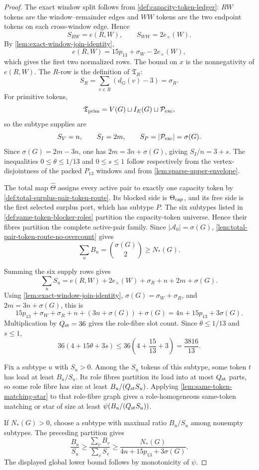 \documentclass[11pt]{article}
\begin{document}
\begin{proof}
The exact window split follows from \cref{def:capacity-token-ledger}: \(RW\)
tokens are the window--remainder edges and \(WW\) tokens are the two endpoint
tokens on each cross-window edge.  Hence
\[
S_{RW}=e(R,W),\qquad S_{WW}=2e_\times(W).
\]
By \cref{lem:exact-window-join-identity},
\[
e(R,W)=15p_{13}+\sigma_W-2e_\times(W),
\]
which gives the first two normalized rows.  The bound on \(x\) is the
nonnegativity of \(e(R,W)\).  The \(R\)-row is the definition of
\(\mathfrak T_R\):
\[
S_R=\sum_{v\in R}(d_G(v)-3)=\sigma_R.
\]
For primitive tokens,
\[
\mathfrak T_{\rm prim}=V(G)\sqcup I_E(G)\sqcup\mathcal P_{\rm exc},
\]
so the subtype supplies are
\[
S_V=n,\qquad S_I=2m,\qquad S_P=|\mathcal P_{\rm exc}|=\sigma(G).
\]
Since \(\sigma(G)=2m-3n\), one has \(2m=3n+\sigma(G)\), giving
\(S_I/n=3+s\).  The inequalities \(0\le\theta\le1/13\) and \(0\le s\le1\)
follow respectively from the vertex-disjointness of the packed \(P_{13}\)
windows and from \cref{lem:sparse-upper-envelope}.

The total map \(\widehat\Theta\) assigns every active pair to exactly one
capacity token by \cref{def:total-surplus-pair-token-route}.  Its blocked side
is \(\Theta_{\rm cap}\), and its free side is the first selected surplus port,
which has subtype \(P\).  The six subtypes listed in
\cref{def:same-token-blocker-roles} partition the capacity-token universe.
Hence their fibres partition the complete active-pair family.  Since
\(|\mathcal A_0|=\sigma(G)\),
\cref{lem:total-pair-token-route-no-overcount} gives
\[
\sum_u B_u=\binom{\sigma(G)}2\ge N_*(G).
\]

Summing the six supply rows gives
\[
\sum_uS_u
=e(R,W)+2e_\times(W)+\sigma_R+n+2m+\sigma(G).
\]
Using \cref{lem:exact-window-join-identity}, \(\sigma(G)=\sigma_W+\sigma_R\),
and \(2m=3n+\sigma(G)\), this is
\[
15p_{13}+\sigma_W+\sigma_R+n+(3n+\sigma(G))+\sigma(G)
=4n+15p_{13}+3\sigma(G).
\]
Multiplication by \(Q_{\rm st}=36\) gives the role-fibre slot count.  Since
\(\theta\le1/13\) and \(s\le1\),
\[
36(4+15\theta+3s)
\le36\left(4+\frac{15}{13}+3\right)
=\frac{3816}{13}.
\]

Fix a subtype \(u\) with \(S_u>0\).  Among the \(S_u\) tokens of this subtype,
some token \(t\) has load at least \(B_u/S_u\).  Its role fibres partition its
load into at most \(Q_{\rm st}\) parts, so some role fibre has size at least
\(B_u/(Q_{\rm st}S_u)\).  Applying
\cref{lem:same-token-matching-star} to that role-fibre graph gives a
role-homogeneous same-token matching or star of size at least
\(\psi(B_u/(Q_{\rm st}S_u))\).

If \(N_*(G)>0\), choose a subtype with maximal ratio \(B_u/S_u\) among nonempty
subtypes.  The preceding partition gives
\[
\frac{B_u}{S_u}
\ge
\frac{\sum_vB_v}{\sum_vS_v}
\ge
\frac{N_*(G)}{4n+15p_{13}+3\sigma(G)}.
\]
The displayed global lower bound follows by monotonicity of \(\psi\).
\end{proof}
\end{document}
